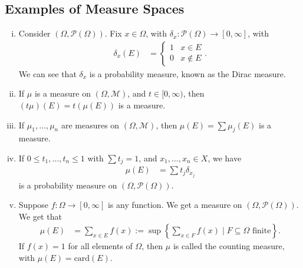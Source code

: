 \documentclass[9pt]{extarticle}
\newcommand{\card}{\text{card}}
\begin{document}
  \subsection{Examples of Measure Spaces}%
  \begin{enumerate}[(i)]
    \item Consider $(\Omega,\mathcal{P}(\Omega))$. Fix $x\in \Omega$, with $\delta_x: \mathcal{P}(\Omega)\rightarrow [0,\infty]$, with
      \begin{align*}
        \delta_x(E) &= \begin{cases}
          1 & x\in E\\
          0 & x\notin E
        \end{cases}.
      \end{align*}
      We can see that $\delta_x$ is a probability measure, known as the Dirac measure.
    \item If $\mu$ is a measure on $(\Omega,\mathcal{M})$, and $t\in [0,\infty)$, then $\left(t\mu\right)(E) = t\left(\mu(E)\right)$ is a measure.
    \item If $\mu_1,\dots,\mu_n$ are measures on $(\Omega,\mathcal{M})$, then $\mu(E) = \sum \mu_j(E)$ is a measure.
    \item If $0\leq t_1,\dots,t_n\leq 1$ with $\sum t_j = 1$, and $x_1,\dots,x_n\in X$, we have
      \begin{align*}
        \mu(E) &= \sum t_j\delta_{x_j}
      \end{align*}
      is a probability measure on $(\Omega,\mathcal{P}(\Omega))$.
    \item Suppose $f: \Omega \rightarrow [0,\infty]$ is any function. We get a measure on $(\Omega,\mathcal{P}(\Omega))$. We get that
      \begin{align*}
        \mu(E) &= \sum_{x\in E}f(x) := \sup \left\{\sum_{x\in F} f(x)\mid F\subseteq \Omega \text{ finite}\right\}.
      \end{align*}
      If $f(x) = 1$ for all elements of $\Omega$, then $\mu$ is called the counting measure, with $\mu(E) = \card(E)$.
  \end{enumerate}
\end{document}
